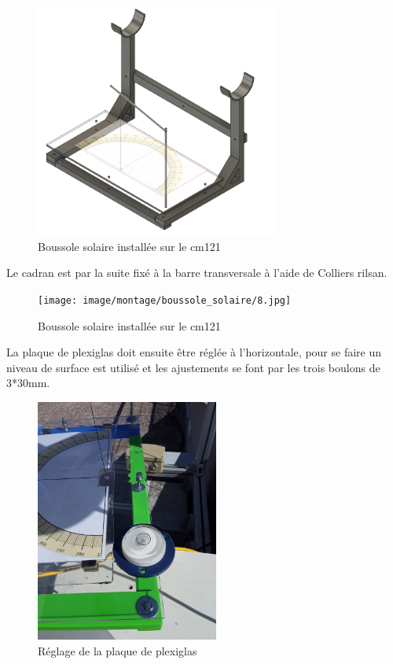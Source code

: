 \documentclass[12pt,a4paper]{article}
\begin{document}
\begin{flushleft}
 \begin{figure}[H]
\centering
\includegraphics[width=8cm]{image/montage/boussole_solaire/1.png} 
\caption{Boussole solaire installée sur le cm121}  
\end{figure}

Le cadran est par la suite fixé à la barre transversale à l'aide de Colliers rilsan.

 \begin{figure}[H]
\centering
\texttt{[image: image/montage/boussole\_solaire/8.jpg]} 
\caption{Boussole solaire installée sur le cm121}  
\end{figure}

La plaque de plexiglas doit ensuite être réglée à l'horizontale, pour se faire un niveau de surface est utilisé et les ajustements se font par les trois boulons de 3*30mm.


 \begin{figure}[H]
\centering
\includegraphics[width=6cm, angle=-90]{image/montage/boussole_solaire/7.jpg} 
\caption{Réglage de la plaque de plexiglas}
\end{figure}


\end{flushleft}
\end{document}
